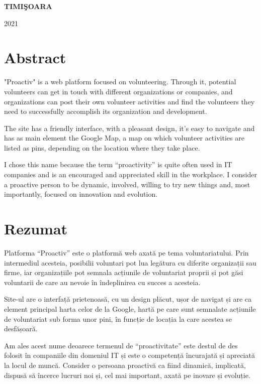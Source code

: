\documentclass[12pt,a4paper]{report}
\begin{document}
\vfill
\begin{center}
{\bf TIMI\c SOARA

2021}
\end{center}
\newpage
\normalsize{}

\setcounter{page}{2}

\section*{Abstract}
\par
"Proactiv" is a web platform focused on volunteering. Through it, potential volunteers can get in touch with different organizations or companies, and organizations can post their own volunteer activities and find the volunteers they need to successfully accomplish its organization and development.
\\ \par
The site has a friendly interface, with a pleasant design, it's easy to navigate and has as main element the Google Map, a map on which volunteer activities are listed as pins, depending on the location where they take place. 
\\ \par
I chose this name because the term “proactivity” is quite often used in IT companies and is an encouraged and appreciated skill in the workplace. I consider a proactive person to be dynamic, involved, willing to try new things and, most importantly, focused on innovation and evolution.


\section*{Rezumat}
\par
Platforma “Proactiv” este o platformă web axată pe tema voluntariatului. Prin intermediul acesteia, posibilii voluntari pot lua legătura cu diferite organizații sau
firme, iar organizațiile pot semnala acțiunile de voluntariat proprii și pot găsi voluntarii de care au nevoie în îndeplinirea cu succes a acesteia.
\\ \par
Site-ul are o interfață prietenoasă, cu un design plăcut, ușor de navigat și are ca element principal harta celor de la Google, hartă pe care sunt semnalate acțiunile de voluntariat sub forma unor pini, în funcție de locația la care acestea se desfășoară.
\\ \par
Am ales acest nume deoarece termenul de “proactivitate” este destul de des folosit în companiile din domeniul IT și este o competență încurajată și apreciată la locul de muncă. Consider o persoana proactivă ca fiind dinamică, implicată, dispusă să încerce lucruri noi și, cel mai important, axată pe inovare și evoluție.
\end{document}
